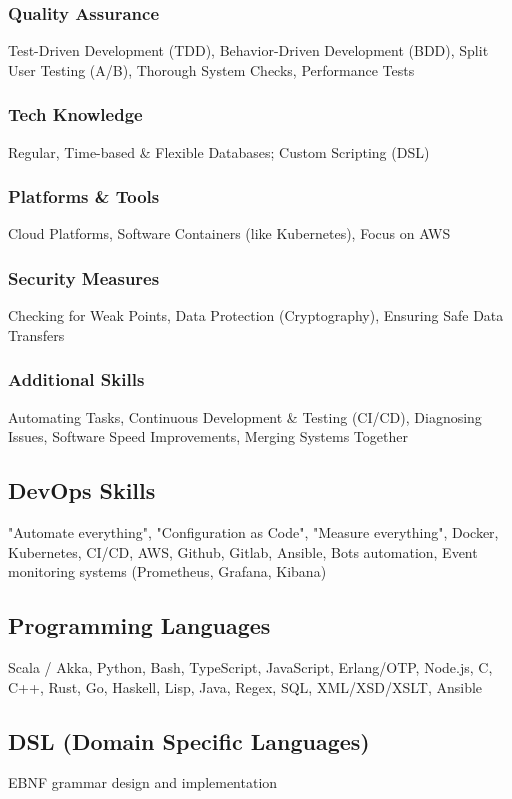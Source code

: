 \subsubsection*{Quality Assurance}
Test-Driven Development (TDD), Behavior-Driven Development (BDD), Split User Testing (A/B), Thorough System Checks, Performance Tests

\subsubsection*{Tech Knowledge}
Regular, Time-based \& Flexible Databases; Custom Scripting (DSL)

\subsubsection*{Platforms \& Tools}
Cloud Platforms, Software Containers (like Kubernetes), Focus on AWS

\subsubsection*{Security Measures}
Checking for Weak Points, Data Protection (Cryptography), Ensuring Safe Data Transfers

\subsubsection*{Additional Skills}
Automating Tasks, Continuous Development \& Testing (CI/CD), Diagnosing Issues, Software Speed Improvements, Merging Systems Together


\subsection*{DevOps Skills}
"Automate everything", "Configuration as Code", "Measure everything", Docker, Kubernetes, CI/CD, AWS, Github, Gitlab, Ansible, Bots automation, Event monitoring systems (Prometheus, Grafana, Kibana)

\subsection*{Programming Languages}
Scala / Akka, Python, Bash, TypeScript, JavaScript, Erlang/OTP, Node.js, C, C++, Rust, Go, Haskell, Lisp, Java, Regex, SQL, XML/XSD/XSLT, Ansible

\subsection*{DSL (Domain Specific Languages)}
EBNF grammar design and implementation

